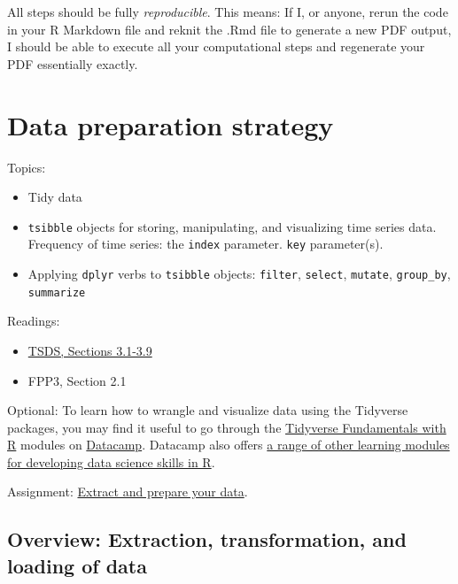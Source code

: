 \documentclass[
]{book}
\providecommand{\tightlist}{%
  \setlength{\itemsep}{0pt}\setlength{\parskip}{0pt}}
\begin{document}
All steps should be fully \emph{reproducible}. This means: If I, or anyone, rerun the code in your R Markdown file and reknit the .Rmd file to generate a new PDF output, I should be able to execute all your computational steps and regenerate your PDF essentially exactly.

\hypertarget{data-preparation-strategy}{%
\chapter{Data preparation strategy}\label{data-preparation-strategy}}

Topics:

\begin{itemize}
\tightlist
\item
  Tidy data
\item
  \texttt{tsibble} objects for storing, manipulating, and visualizing time series data. Frequency of time series: the \texttt{index} parameter. \texttt{key} parameter(s).
\item
  Applying \texttt{dplyr} verbs to \texttt{tsibble} objects: \texttt{filter}, \texttt{select}, \texttt{mutate}, \texttt{group\_by}, \texttt{summarize}
\end{itemize}

Readings:

\begin{itemize}
\tightlist
\item
  \href{https://jhudatascience.org/tidyversecourse/wrangle-data.html\#anonymous-functions}{TSDS, Sections 3.1-3.9}
\item
  FPP3, Section 2.1
\end{itemize}

Optional: To learn how to wrangle and visualize data using the Tidyverse packages, you may find it useful to go through the \href{https://learn.datacamp.com/skill-tracks/tidyverse-fundamentals}{Tidyverse Fundamentals with R} modules on \href{https://learn.datacamp.com/}{Datacamp}. Datacamp also offers \href{https://learn.datacamp.com/career-tracks/data-scientist-with-r}{a range of other learning modules for developing data science skills in R}.

Assignment: \href{https://github.com/uva-eng-time-series-sp21/sys5581-course-materials/blob/master/assignments/assignment_data_etl.pdf}{Extract and prepare your data}.

\hypertarget{overview-extraction-transformation-and-loading-of-data}{%
\section{Overview: Extraction, transformation, and loading of data}\label{overview-extraction-transformation-and-loading-of-data}}
\end{document}

